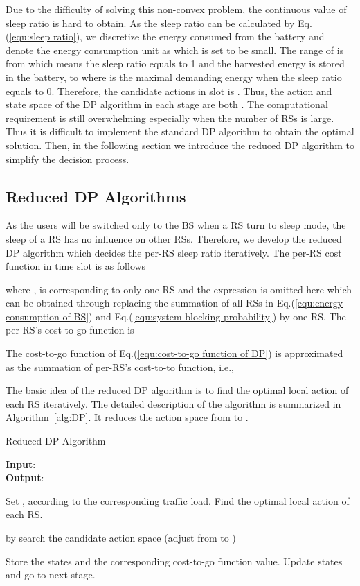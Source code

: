 \documentclass[conference]{IEEEtran}
\begin{document}
  Due to the difficulty of solving this non-convex problem, the continuous value of sleep ratio is hard to obtain. As the sleep ratio can be calculated by Eq.(\ref{equ:sleep ratio}), we discretize the energy consumed from the battery  and denote the energy consumption unit as  which is set to be small. The range of  is from  which means the sleep ratio equals to 1 and the harvested energy is stored in the battery, to  where  is the maximal demanding energy when the sleep ratio equals to 0. Therefore, the candidate actions in slot  is . Thus, the action and state space of the DP algorithm in each stage are both . The computational requirement is still overwhelming especially when the number of RSs is large. Thus it is difficult to implement the standard DP algorithm to obtain the optimal solution. Then, in the following section we introduce the reduced DP algorithm to simplify the decision process.

 \subsection{Reduced DP Algorithms}
 As the users will be switched only to the BS when a RS turn to sleep mode, the sleep of a RS has no influence on other RSs. Therefore, we develop the reduced DP algorithm which decides the per-RS sleep ratio iteratively.
 The per-RS cost function in time slot  is as follows
 
 where ,  is corresponding to only one RS and the expression is omitted here which can be obtained through replacing the summation of all RSs in Eq.(\ref{equ:energy consumption of BS}) and Eq.(\ref{equ:system blocking probability}) by one RS.
 The per-RS's cost-to-go function is
 

 The cost-to-go function of Eq.(\ref{equ:cost-to-go function of DP}) is approximated as the summation of per-RS's cost-to-to function, i.e.,
 
 

 The basic idea of the reduced DP algorithm is to find the optimal local action of each RS iteratively. The detailed description of the algorithm is summarized in Algorithm~\ref{alg:DP}. It reduces the action space from  to .
 \vspace{-0.3cm}
 \begin{algorithm}[htb]
 \caption{Reduced DP Algorithm}
 \textbf{Input}:{ }\\
 \textbf{Output}:{ }
 \begin{algorithmic}[1]
 \label{alg:DP}
    \STATE Set ,  according to the corresponding traffic load.
        \STATE Find the optimal local action of each RS.
            \IF {}
                \STATE
                 
            \ELSE
                \STATE  by search the candidate action space (adjust  from  to )
                
            \ENDIF
        \STATE Store the states and the corresponding cost-to-go function value.
    \ENDFOR
    \STATE Update states and go to next stage.
 \ENDFOR
\end{algorithmic}
 \end{algorithm}
 \vspace{-0.3cm}
\end{document}
